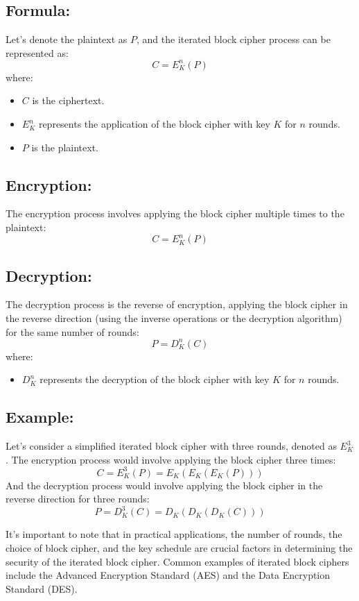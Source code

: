 \documentclass[11pt]{article}
\begin{document}
\subsection*{Formula:}
Let's denote the plaintext as $P$, and the iterated block cipher process can be represented as:
\[ C = E_K^n(P) \]
where:
\begin{itemize}
    \item $C$ is the ciphertext.
    \item $E_K^n$ represents the application of the block cipher with key $K$ for $n$ rounds.
    \item $P$ is the plaintext.
\end{itemize}

\subsection*{Encryption:}
The encryption process involves applying the block cipher multiple times to the plaintext:
\[ C = E_K^n(P) \]

\subsection*{Decryption:}
The decryption process is the reverse of encryption, applying the block cipher in the reverse direction (using the inverse operations or the decryption algorithm) for the same number of rounds:
\[ P = D_K^n(C) \]
where:
\begin{itemize}
    \item $D_K^n$ represents the decryption of the block cipher with key $K$ for $n$ rounds.
\end{itemize}

\subsection*{Example:}
Let's consider a simplified iterated block cipher with three rounds, denoted as $E_K^3$. The encryption process would involve applying the block cipher three times:
\[ C = E_K^3(P) = E_K(E_K(E_K(P))) \]
And the decryption process would involve applying the block cipher in the reverse direction for three rounds:
\[ P = D_K^3(C) = D_K(D_K(D_K(C))) \]

It's important to note that in practical applications, the number of rounds, the choice of block cipher, and the key schedule are crucial factors in determining the security of the iterated block cipher. Common examples of iterated block ciphers include the Advanced Encryption Standard (AES) and the Data Encryption Standard (DES).
\end{document}
